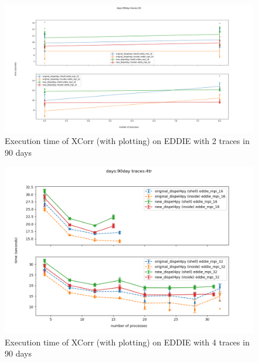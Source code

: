 \begin{figure}[h]
\centering
    \includegraphics[width=1\textwidth]{figures/xcorr_eddie_90day_2tr}
\caption{Execution time of XCorr (with plotting) on EDDIE with 2 traces in 90 days}
\label{fig:xcorr_eddie_2tr}
\end{figure}

\begin{figure}[h]
\centering
    \includegraphics[width=1\textwidth]{figures/xcorr_eddie_90day_4tr}
\caption{Execution time of XCorr (with plotting) on EDDIE with 4 traces in 90 days}
\label{fig:xcorr_eddie}
\end{figure}

